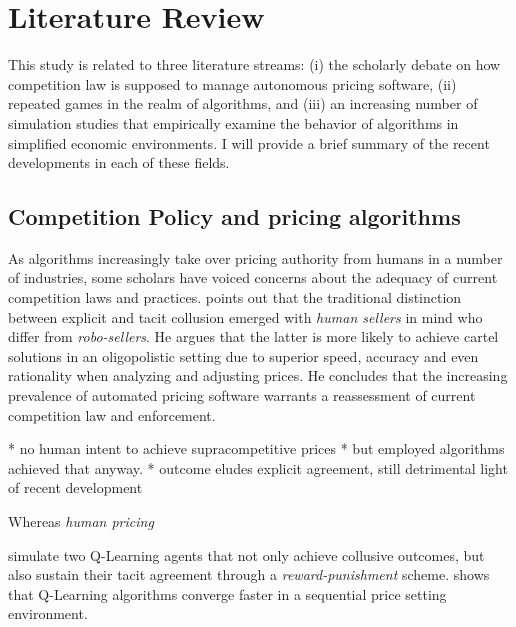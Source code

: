 \section{Literature Review}
This study is related to three literature streams: (i) the scholarly debate on how competition law is supposed to manage autonomous pricing software, (ii)  repeated games in the realm of algorithms, and (iii) an increasing number of simulation studies that empirically examine the behavior of algorithms in simplified economic environments. I will provide a brief summary of the recent developments in each of these fields.

\subsection{Competition Policy and pricing algorithms}
As algorithms increasingly take over pricing authority from humans in a number of industries, some scholars have voiced concerns about the adequacy of current competition laws and practices. \textcite{mehra_antitrust_2015} points out that the traditional distinction between explicit and tacit collusion emerged with \emph{human sellers} in mind who differ from \emph{robo-sellers}. He argues that the latter is more likely to achieve cartel solutions in an oligopolistic setting due to superior speed, accuracy and even rationality when analyzing and adjusting prices. He concludes that the increasing prevalence of automated pricing software warrants a reassessment of current competition law and enforcement. 

* no human intent to achieve supracompetitive prices
	* but employed algorithms achieved that anyway. 
	* outcome eludes explicit agreement, still detrimental
 light of recent development 

Whereas \emph{human pricing} 



\textcite{calvano_artificial_2019} simulate two Q-Learning agents that not only achieve collusive outcomes, but also sustain their tacit agreement through a \emph{reward-punishment} scheme. \textcite{klein_autonomous_2019} shows that Q-Learning algorithms converge faster in a sequential price setting environment.